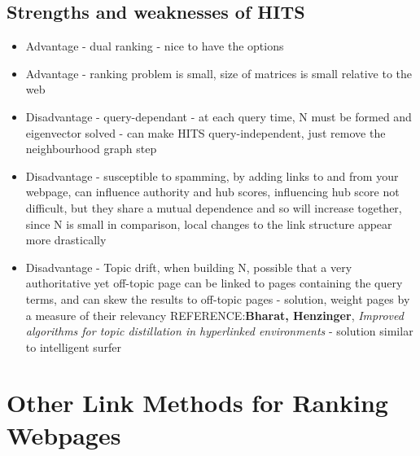 \documentclass[11pt]{report}
\begin{document}
\section{Strengths and weaknesses of HITS}
\begin{itemize}
\item Advantage - dual ranking - nice to have the options
\item Advantage - ranking problem is small, size of matrices is small relative to the web
\item Disadvantage - query-dependant - at each query time, N must be formed and eigenvector solved - can make HITS query-independent, just remove the neighbourhood graph step
\item Disadvantage - susceptible to spamming, by adding links to and from your webpage, can influence authority and hub scores, influencing hub score not difficult, but they share a mutual dependence and so will increase together, since N is small in comparison, local changes to the link structure appear more drastically
\item Disadvantage - Topic drift, when building N, possible that a very authoritative yet off-topic page can be linked to pages containing the query terms, and can skew the results to off-topic pages - solution, weight pages by a measure of their relevancy REFERENCE:\textbf{Bharat, Henzinger}, \textit{Improved algorithms for topic distillation in hyperlinked environments}  - solution similar to intelligent surfer
\end{itemize}
\chapter{Other Link Methods for Ranking Webpages}
\end{document}
